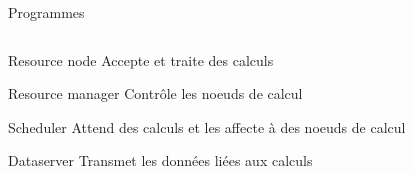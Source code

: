 \documentclass{beamer}
\begin{document}
\begin{frame}{Programmes}
\begin{columns}
\begin{column}[r]{0.5\linewidth}
        \begin{block}{Resource node}
            Accepte et traite des calculs
        \end{block}
        \begin{block}{Resource manager}
            Contrôle les noeuds de calcul
        \end{block}
        \begin{alertblock}{Scheduler}
            Attend des calculs et les affecte à des noeuds de calcul
        \end{alertblock}
        \begin{exampleblock}{Dataserver}
            Transmet les données liées aux calculs
        \end{exampleblock}
        
	\end{column}
	\end{columns}
\end{frame}
\end{document}
